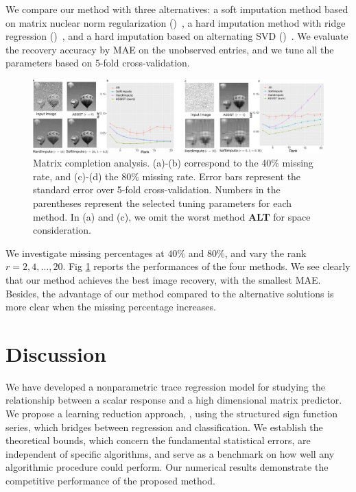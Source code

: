 \documentclass[11pt]{article}
\theoremstyle{plain}
\theoremstyle{definition}
\def\NonparaM{\text{\bf \footnotesize ASSIST}}
\def\HardImpute{\text{\bf \small HardImpute}}
\def\SoftImpute{\text{\bf \small SoftImpute}}
\def\ALT{\text{\bf \small ALT}}
\begin{document}
We compare our method with three alternatives: a soft imputation method based on matrix nuclear norm regularization (\SoftImpute)~\citep{hastie2015matrix}, a hard imputation method with ridge regression (\HardImpute)~\citep{mazumder2010spectral}, and a hard imputation based on alternating SVD (\ALT)~\citep{rennie2005fast}. We evaluate the recovery accuracy by MAE on the unobserved entries, and we tune all the parameters based on 5-fold cross-validation. 

\begin{figure}[t!]
\includegraphics[width = \textwidth]{figure/completion.pdf}
\caption{Matrix completion analysis. (a)-(b) correspond to the 40\% missing rate, and (c)-(d) the 80\% missing rate. Error bars represent the standard error over 5-fold cross-validation. Numbers in the parentheses represent the selected tuning parameters for each method. In (a) and (c), we omit the worst method {\bf \scriptsize ALT} for space consideration.}
\label{fig:braincv}
\end{figure}

We investigate missing percentages at $40\%$ and $80\%$, and vary the rank $r=2,4,\ldots,20$. Fig \ref{fig:braincv} reports the performances of the four methods. We see clearly that our method achieves the best image recovery, with the smallest MAE. Besides, the advantage of our method compared to the alternative solutions is more clear when the missing percentage increases. 





\section{Discussion}
\label{sec:discussion}

We have developed a nonparametric trace regression model for studying the relationship between a scalar response and a high dimensional matrix predictor. We propose a learning reduction approach, \NonparaM, using the structured sign function series, which bridges between regression and classification. We establish the theoretical bounds, which concern the fundamental statistical errors, are independent of specific algorithms, and serve as a benchmark on how well any algorithmic procedure could perform. Our numerical results demonstrate the competitive performance of the proposed method.
\end{document}
